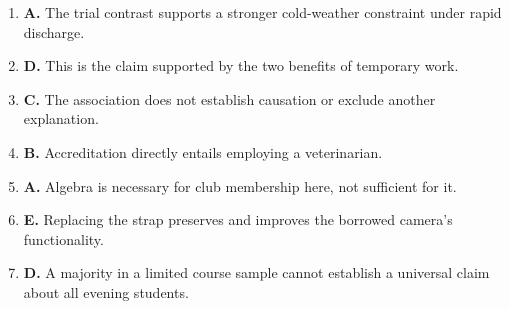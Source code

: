 \begin{enumerate}
\item \textbf{A.} The trial contrast supports a stronger cold-weather constraint under rapid discharge.
\item \textbf{D.} This is the claim supported by the two benefits of temporary work.
\item \textbf{C.} The association does not establish causation or exclude another explanation.
\item \textbf{B.} Accreditation directly entails employing a veterinarian.
\item \textbf{A.} Algebra is necessary for club membership here, not sufficient for it.
\item \textbf{E.} Replacing the strap preserves and improves the borrowed camera's functionality.
\item \textbf{D.} A majority in a limited course sample cannot establish a universal claim about all evening students.
\end{enumerate}

